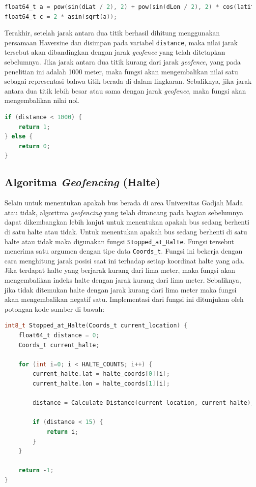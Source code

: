 \begin{lstlisting}[language=c]
float64_t a = pow(sin(dLat / 2), 2) + pow(sin(dLon / 2), 2) * cos(latitude) * cos(longitude);
float64_t c = 2 * asin(sqrt(a));
\end{lstlisting}

Terakhir, setelah jarak antara dua titik berhasil dihitung menggunakan persamaan Haversine dan disimpan pada variabel \texttt{distance}, maka nilai jarak tersebut akan dibandingkan dengan jarak \textit{geofence} yang telah ditetapkan sebelumnya. Jika jarak antara dua titik kurang dari jarak \textit{geofence}, yang pada penelitian ini adalah 1000 meter, maka fungsi akan mengembalikan nilai satu sebagai representasi bahwa titik berada di dalam lingkaran. Sebaliknya, jika jarak antara dua titik lebih besar atau sama dengan jarak \textit{geofence}, maka fungsi akan mengembalikan nilai nol.

\begin{lstlisting}[language=c]
 if (distance < 1000) {
	return 1;
} else {
	return 0;
}
\end{lstlisting}

\subsection{Algoritma \textit{Geofencing} (Halte)}
Selain untuk menentukan apakah bus berada di area Universitas Gadjah Mada atau tidak, algoritma \textit{geofencing} yang telah dirancang pada bagian sebelumnya dapat dikembangkan lebih lanjut untuk menentukan apakah bus sedang berhenti di satu halte atau tidak. Untuk menentukan apakah bus sedang berhenti di satu halte atau tidak maka digunakan fungsi \texttt{Stopped\_at\_Halte}. Fungsi tersebut menerima satu argumen dengan tipe data \texttt{Coords\_t}. Fungsi ini bekerja dengan cara menghitung jarak posisi saat ini terhadap setiap koordinat halte yang ada. Jika terdapat halte yang berjarak kurang dari lima meter, maka fungsi akan mengembalikan indeks halte dengan jarak kurang dari lima meter. Sebaliknya, jika tidak ditemukan halte dengan jarak kurang dari lima meter maka fungsi akan mengembalikan negatif satu. Implementasi dari fungsi ini ditunjukan oleh potongan kode sumber di bawah:

\begin{lstlisting}[language=c]
int8_t Stopped_at_Halte(Coords_t current_location) {
	float64_t distance = 0;
	Coords_t current_halte;
	
	for (int i=0; i < HALTE_COUNTS; i++) {
		current_halte.lat = halte_coords[0][i];
		current_halte.lon = halte_coords[1][i];
		
		distance = Calculate_Distance(current_location, current_halte);
		
		if (distance < 15) {
			return i;
		}
	}
	
	return -1;
}
\end{lstlisting}

